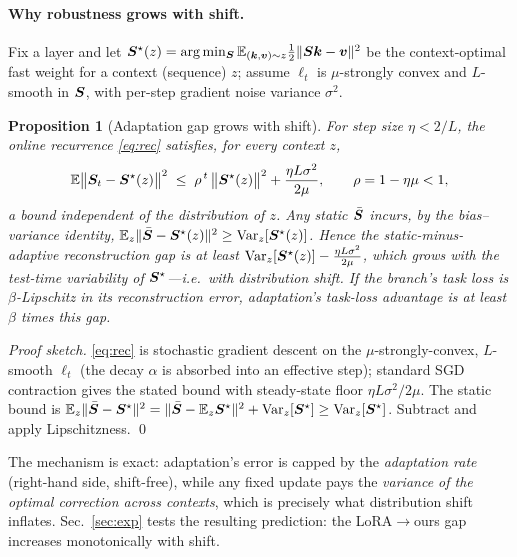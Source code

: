 \documentclass{article}       %
\newtheorem{proposition}{Proposition}
\begin{document}
\paragraph{Why robustness grows with shift.} Fix a layer and let $\bm{S}^\star(z)=\arg\min_{\bm{S}}\mathbb E_{(\bm{k},\bm{v})\sim z}
\tfrac12\|\bm{S}\bm{k}-\bm{v}\|^2$ be the context-optimal fast weight for a context (sequence) $z$; assume $\ell_t$ is
$\mu$-strongly convex and $L$-smooth in $\bm{S}$, with per-step gradient noise variance $\sigma^2$.
\begin{proposition}[Adaptation gap grows with shift]\label{prop:ood}
For step size $\eta<2/L$, the online recurrence \eqref{eq:rec} satisfies, for \emph{every} context $z$,
\begin{equation}
\mathbb E\big\|\bm{S}_t-\bm{S}^\star(z)\big\|^2\;\le\;\rho^{\,t}\,\big\|\bm{S}^\star(z)\big\|^2+\frac{\eta L\sigma^2}{2\mu},
\qquad \rho=1-\eta\mu<1,
\end{equation}
a bound \emph{independent of the distribution of $z$}. Any static $\bar{\bm{S}}$ incurs, by the bias--variance identity,
$\mathbb E_z\|\bar{\bm{S}}-\bm{S}^\star(z)\|^2\ge\operatorname{Var}_z[\bm{S}^\star(z)]$. Hence the static-minus-adaptive reconstruction
gap is at least $\operatorname{Var}_z[\bm{S}^\star(z)]-\tfrac{\eta L\sigma^2}{2\mu}$, which grows with the test-time
variability of $\bm{S}^\star$---i.e.\ with distribution shift. If the branch's task loss is $\beta$-Lipschitz in its
reconstruction error, adaptation's task-loss advantage is at least $\beta$ times this gap.
\end{proposition}
\begin{proof}[Proof sketch]
\eqref{eq:rec} is stochastic gradient descent on the $\mu$-strongly-convex, $L$-smooth $\ell_t$ (the decay $\alpha$ is
absorbed into an effective step); standard SGD contraction gives the stated bound with steady-state floor
$\eta L\sigma^2/2\mu$. The static bound is $\mathbb E_z\|\bar{\bm{S}}-\bm{S}^\star\|^2=\|\bar{\bm{S}}-\mathbb E_z\bm{S}^\star\|^2+
\operatorname{Var}_z[\bm{S}^\star]\ge\operatorname{Var}_z[\bm{S}^\star]$. Subtract and apply Lipschitzness. \qed
\end{proof}
The mechanism is exact: adaptation's error is capped by the \emph{adaptation rate} (right-hand side, shift-free), while any
fixed update pays the \emph{variance of the optimal correction across contexts}, which is precisely what distribution shift
inflates. Sec.~\ref{sec:exp} tests the resulting prediction: the LoRA$\to$ours gap increases monotonically with shift.
\end{document}
